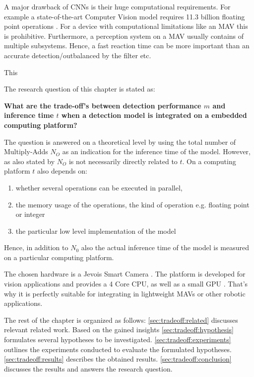 	A major drawback of \acp{CNN} is their huge computational requirements. For example a state-of-the-art Computer Vision model \cite{He2015} requires 11.3 billion floating point operations \cite{Tschannen2017}. For a device with computational limitations like an \ac{MAV} this is prohibitive. Furthermore, a perception system on a \ac{MAV} usually contains of multiple subsystems. Hence, a fast reaction time can be more important than an accurate detection/outbalanced by the filter etc.
	
	This
	
	The research question of this chapter is stated as:
	
	\begin{center}
		\textbf{What are the trade-off's between detection performance $m$ and inference time $t$ when a detection model is integrated on a embedded computing platform?}
	\end{center}
	
	The question is answered on a theoretical level by using the total number of \ac{Multiply-Adds} $N_O$ as an indication for the inference time of the model. However, as also stated by  $N_O$ is not necessarily directly related to $t$. On a computing platform $t$ also depends on:
	
	\begin{enumerate}
		\item whether several operations can be executed in parallel,
		\item the memory usage of the operations, the kind of operation e.g. floating point or integer
		\item the particular low level implementation of the model
	\end{enumerate} 
	
	Hence, in addition to $N_0$ also the actual inference time of the model is measured on a particular computing platform.
	
	The chosen hardware is a Jevois Smart Camera . The platform is developed for vision applications and provides a 4 Core CPU, as well as a small GPU . That's why it is perfectly suitable for integrating in lightweight \acp{MAV} or other robotic applications.
	
	The rest of the chapter is organized as follows: \autoref{sec:tradeoff:related} discusses relevant related work. Based on the gained insights \autoref{sec:tradeoff:hypothesis} formulates several hypotheses to be investigated. \autoref{sec:tradeoff:experiments} outlines the experiments conducted to evaluate the formulated hypotheses. \autoref{sec:tradeoff:results} describes the obtained results. \autoref{sec:tradeoff:conclusion} discusses the results and answers the research question.
	